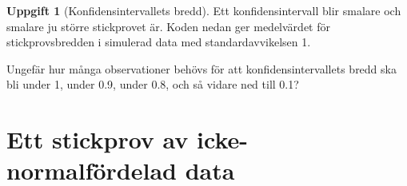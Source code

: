 \documentclass[
]{book}
\newenvironment{Shaded}{\begin{snugshade}}{\end{snugshade}}
\newcommand{\AttributeTok}[1]{\textcolor[rgb]{0.13,0.29,0.53}{#1}}
\newcommand{\ControlFlowTok}[1]{\textcolor[rgb]{0.13,0.29,0.53}{\textbf{#1}}}
\newcommand{\DecValTok}[1]{\textcolor[rgb]{0.00,0.00,0.81}{#1}}
\newcommand{\FunctionTok}[1]{\textcolor[rgb]{0.13,0.29,0.53}{\textbf{#1}}}
\newcommand{\NormalTok}[1]{#1}
\newcommand{\OtherTok}[1]{\textcolor[rgb]{0.56,0.35,0.01}{#1}}
\newcommand{\SpecialCharTok}[1]{\textcolor[rgb]{0.81,0.36,0.00}{\textbf{#1}}}
\theoremstyle{definition}
\theoremstyle{definition}
\theoremstyle{definition}
\newtheorem{exercise}{Uppgift}[chapter]
\theoremstyle{definition}
\theoremstyle{remark}
\begin{document}
\begin{exercise}[Konfidensintervallets bredd]
Ett konfidensintervall blir smalare och smalare ju större stickprovet är. Koden nedan ger medelvärdet för stickprovsbredden i simulerad data med standardavvikelsen 1.

\begin{Shaded}
\end{Shaded}

Ungefär hur många observationer behövs för att konfidensintervallets bredd ska bli under 1, under 0.9, under 0.8, och så vidare ned till 0.1?
\end{exercise}

\chapter{Ett stickprov av icke-normalfördelad data}\label{ett-stickprov-av-icke-normalfuxf6rdelad-data}
\end{document}
